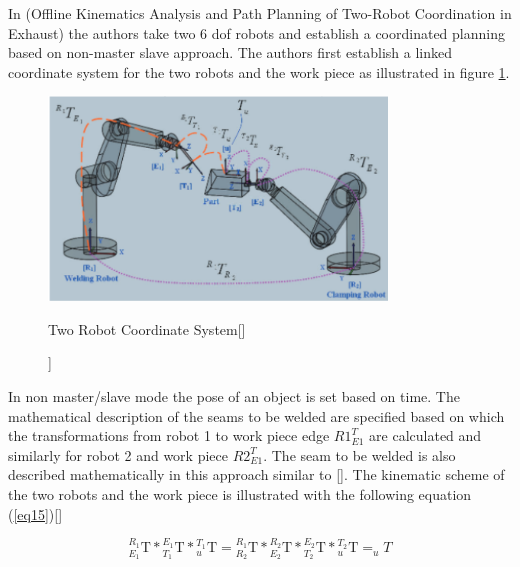 In \citet{Ouyang2012}(Offline Kinematics Analysis and Path Planning of Two-Robot Coordination in Exhaust) the authors take two 6 dof robots and establish a coordinated planning based on non-master slave approach. 
The authors first establish a linked coordinate system for the two robots and the work piece as illustrated in figure \ref{fig:img4}.
\begin{figure}[htbp] %
 \centering
   \includegraphics[width=9cm]{images/JointCoordinate2robs.png}
   \caption[Two Robot Coordinate System[\citet{Ouyang2012}]]
   {Two Robot Coordinate System[\citet{Ouyang2012}]}  
\label{fig:img4}
\end{figure}
In non master/slave mode the pose of an object is set based on time. The mathematical description of the seams to be welded are specified based on which the transformations from robot 1 to work piece edge ${R1}^T_{E1} $ are calculated and similarly for robot 2 and work piece ${R2}^T_{E1}$. The seam to be welded is also described mathematically in this approach similar to [\citet{Zhou2016}]. The kinematic scheme of the two robots and the work piece is illustrated with the following equation (\eqref{eq15})[\citet{Ouyang2012}]

\begin{equation}
\label{eq15}
{_{E_{1}}^{R_{1}}\textrm{T}} *{_{T_{1}}^{E_{1}}\textrm{T}} *{_{u}^{T_{1}}\textrm{T}} = {_{R_{2}}^{R_{1}}\textrm{T}} *{_{E_{2}}^{R_{2}}\textrm{T}}*{_{T_{2}}^{E_{2}}\textrm{T}} *{_{u}^{T_{2}}\textrm{T}} = _{u}T
\end{equation}

